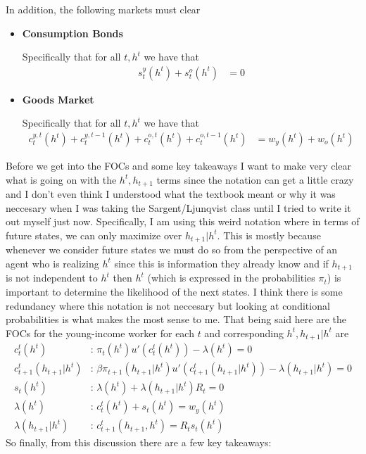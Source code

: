 \documentclass[11pt,english]{article}
\begin{document}
In addition, the following markets must clear \begin{itemize}
	\item \textbf{Consumption Bonds}
	
	Specifically that for all $t,h^t$ we have that \begin{align*}
		s_{t}^{y}(h^t) + s_{t}^{o}(h^t) &= 0 
	\end{align*}

	\item \textbf{Goods Market} 

	Specifically that for all $t, h^t$ we have that \begin{align*}
		c_{t}^{y,t}(h^t) + c_{t}^{y,t-1}(h^t) + c_{t}^{o,t}(h^t) + c_{t}^{o,t-1}(h^t) &= w_y(h^t) + w_o(h^t)
	\end{align*}
\end{itemize}
Before we get into the FOCs and some key takeaways I want to make very clear what is going on with the $h^t, h_{t+1}$ terms since the notation can get a little crazy and I don't even think I understood what the textbook meant or why it was neccesary when I was taking the Sargent/Ljunqvist class until I tried to write it out myself just now. Specifically, I am using this weird notation where in terms of future states, we can only maximize over $h_{t+1}|h^t$. This is mostly because whenever we consider future states we must do so from the perspective of an agent who is realizing $h^t$ since this is information they already know and if $h_{t+1}$ is not independent to $h^t$ then $h^t$ (which is expressed in the probabilities $\pi_t$) is important to determine the likelihood of the next states. I think there is some redundancy where this notation is not neccesary but looking at conditional probabilities is what makes the most sense to me. That being said here are the FOCs for the young-income worker for each $t$ and corresponding $h^t, h_{t+1}|h^t$ are
\begin{align*}
	c_t^t(h^t) &:\, \pi_t(h^t)u'(c_t^t(h^t)) - \lambda(h^t) = 0\\	
	c_{t+1}^t(h_{t+1}|h^t) &:\, \beta \pi_{t+1}(h_{t+1}|h^t)u'(c_{t+1}^t(h_{t+1}|h^t))  - \lambda(h_{t+1}|h^t) = 0\\
	s_t(h^t) &:\, \lambda(h^t) + \lambda(h_{t+1}|h^t) R_t = 0 \\
	\lambda(h^t) &:\, c^t_t(h^t) + s_t(h^t) = w_y(h^t)\\
	\lambda(h_{t+1}|h^t) &:\, c_{t+1}^t(h_{t+1}, h^t) = R_ts_t(h^t)
\end{align*}
So finally, from this discussion there are a few key takeaways:
\end{document}
